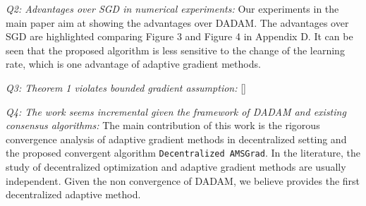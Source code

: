 \documentclass{article}
\begin{document}
\textit{Q2: Advantages over SGD in numerical experiments:}
Our experiments in the main paper aim at showing the advantages over DADAM. 
The advantages over SGD are highlighted comparing Figure 3 and Figure 4 in Appendix D. 
It can be seen that the proposed algorithm is less sensitive to the change of the learning rate, which is one advantage of adaptive gradient methods.

\textit{Q3: Theorem 1 violates bounded gradient assumption:}
[]

\textit{Q4: The work seems incremental given the framework of DADAM and existing consensus algorithms:}
The main contribution of this work is the rigorous convergence analysis of adaptive gradient methods in decentralized setting and the proposed convergent algorithm \texttt{Decentralized AMSGrad}. 
In the literature, the study of decentralized optimization and adaptive gradient methods are usually independent. 
Given the non convergence of DADAM, we believe provides the first decentralized adaptive method.
\end{document}
